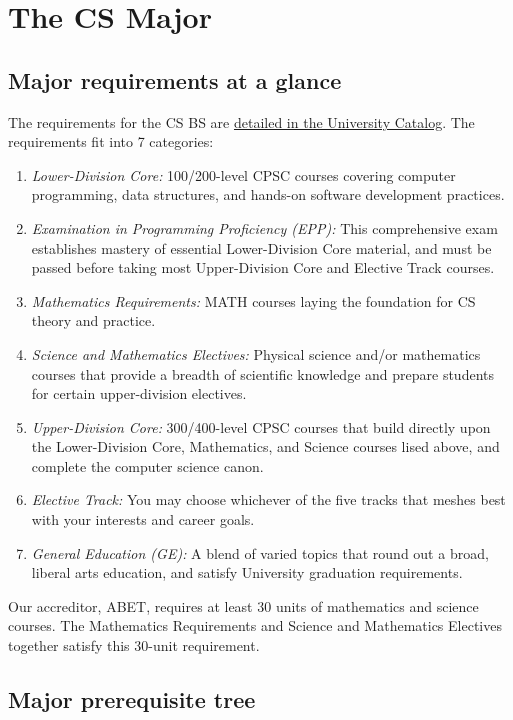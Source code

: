 \documentclass{book}
\begin{document}
\chapter{The CS Major}

\section{Major requirements at a glance}

The requirements for the CS BS are \href{http://catalog.fullerton.edu/preview_program.php?catoid=2&poid=537&returnto=137}{detailed in the University Catalog}. The requirements fit into 7 categories:
\begin{enumerate}
\item \emph{Lower-Division Core:} 100/200-level CPSC courses covering computer programming, data structures, and hands-on software development practices.
\item \emph{Examination in Programming Proficiency (EPP):} This comprehensive exam establishes mastery of essential Lower-Division Core material, and must be passed before taking most Upper-Division Core and Elective Track courses. 
\item \emph{Mathematics Requirements:} MATH courses laying the foundation for CS theory and practice.
\item \emph{Science and Mathematics Electives:} Physical science and/or mathematics courses that provide a breadth of scientific knowledge and prepare students for certain upper-division electives.
\item \emph{Upper-Division Core:} 300/400-level CPSC courses that build directly upon the Lower-Division Core, Mathematics, and Science courses lised above, and complete the computer science canon.
\item \emph{Elective Track:} You may choose whichever of the five tracks that meshes best with your interests and career goals.
\item \emph{General Education (GE):} A blend of varied topics that round out a broad, liberal arts education, and satisfy University graduation requirements.
\end{enumerate}
  
Our accreditor, ABET, requires at least 30 units of mathematics and science courses. The Mathematics Requirements and Science and Mathematics Electives together satisfy this 30-unit requirement.

\section{Major prerequisite tree}
\label{section:major_prerequisite_tree}
\end{document}
